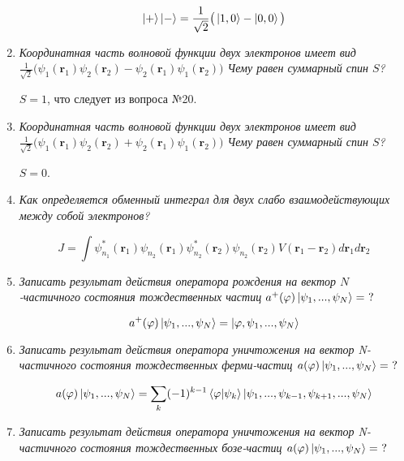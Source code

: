 \documentclass{article}
\begin{document}
\begin{enumerate}
	\begin{equation}
		\ket{+} \ket{-} = \frac{1}{\sqrt{2}} \big( \ket{1,0} - \ket{0,0} \big)
	\end{equation}
	
	\item \textit{Координатная часть волновой функции двух электронов имеет вид
$\frac{1}{\sqrt{2}}\big( \psi_1(\textbf{r}_1) \psi_2(\textbf{r}_2) - \psi_2(\textbf{r}_1) \psi_1(\textbf{r}_2) \big)$ Чему равен суммарный спин $S$?}

	$S = 1$, что следует из вопроса №20.
	
	\item \textit{Координатная часть волновой функции двух электронов имеет вид
$\frac{1}{\sqrt{2}}\big( \psi_1(\textbf{r}_1) \psi_2(\textbf{r}_2) + \psi_2(\textbf{r}_1) \psi_1(\textbf{r}_2) \big)$ Чему равен суммарный спин $S$?}

	$S=0$.	
	
	\item \textit{Как определяется обменный интеграл для двух слабо взаимодействующих между собой электронов?}
	
	\begin{equation}
		J = \int \psi_{n_1}^*(\textbf{r}_1) \psi_{n_2}(\textbf{r}_1) \psi_{n_2}^*(\textbf{r}_2) \psi_{n_2}(\textbf{r}_2) V(\textbf{r}_1 - \textbf{r}_2) d\textbf{r}_1 d\textbf{r}_2
	\end{equation}
	
	\item \textit{Записать результат действия оператора рождения на вектор $N$-частичного состояния тождественных частиц $a^+(\varphi)\ket{\psi_1, . . . , \psi_N} = \ ?$}
	
	\begin{equation}
		a^+(\varphi)\ket{\psi_1, . . . , \psi_N} = \ket{\varphi,\psi_1, . . . , \psi_N}
	\end{equation}
	
	\item \textit{Записать результат действия оператора уничтожения на вектор N-частичного состояния тождественных ферми-частиц $a(\varphi)\ket{\psi_1, . . . , \psi_N} = \ ?$}
	
	\begin{equation}
		a(\varphi)\ket{\psi_1, . . . , \psi_N} = \sum\limits_{k} (-1)^{k-1} \braket{\varphi|\psi_k} \ket{\psi_1,...,\psi_{k-1},\psi_{k+1},...,\psi_N}
	\end{equation}
	
	\item \textit{Записать результат действия оператора уничтожения на вектор N-частичного состояния тождественных бозе-частиц $a(\varphi)\ket{\psi_1, . . . , \psi_N} = \ ?$}
	

\end{enumerate}
\end{document}
